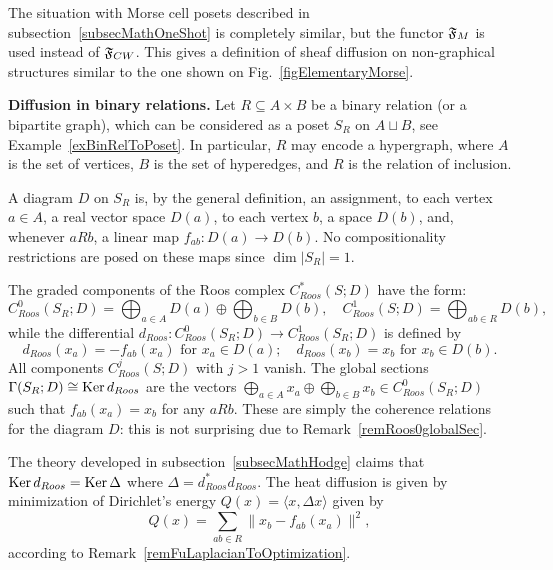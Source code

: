 \begin{rem}\label{remDiffusionOnMorse}
The situation with Morse cell posets described in subsection~\ref{subsecMathOneShot} is completely similar, but the functor $\mathfrak{F}_{M}$ is used instead of $\mathfrak{F}_{CW}$. This gives a definition of sheaf diffusion on non-graphical structures similar to the one shown on Fig.~\ref{figElementaryMorse}.
\end{rem}

\textbf{Diffusion in binary relations.} Let $R\subseteq A\times B$ be a binary relation (or a bipartite graph), which can be considered as a poset $S_R$ on $A\sqcup B$, see Example~\ref{exBinRelToPoset}. In particular, $R$ may encode a hypergraph, where $A$ is the set of vertices, $B$ is the set of hyperedges, and $R$ is the relation of inclusion. 

\begin{con}\label{conHypergraphDiffusion}
A diagram $D$ on $S_R$ is, by the general definition, an assignment, to each vertex $a\in A$, a real vector space $D(a)$, to each vertex $b$, a space $D(b)$, and, whenever $aRb$, a linear map $f_{ab}\colon D(a)\to D(b)$. No compositionality restrictions are posed on these maps since $\dim |S_R|=1$.

The graded components of the Roos complex $C^*_{Roos}(S;D)$ have the form:
\[
C^0_{Roos}(S_R;D)=\bigoplus_{a\in A}D(a)\oplus\bigoplus_{b\in B}D(b),\quad C^1_{Roos}(S;D)=\bigoplus_{ab\in R}D(b),
\]
while the differential $d_{Roos}\colon C^0_{Roos}(S_R;D)\to C^1_{Roos}(S_R;D)$ is defined by
\[
d_{Roos}(x_a)=-f_{ab}(x_a) \mbox{ for }x_a\in D(a);\quad d_{Roos}(x_b)=x_b \mbox{ for }x_b\in D(b).
\]
All components $C^j_{Roos}(S;D)$ with $j>1$ vanish. The global sections $\Gamma(S_R;D)\cong \operatorname{Ker} d_{Roos}$ are the vectors $\bigoplus_{a\in A}x_a\oplus \bigoplus_{b\in B}x_b\in C^0_{Roos}(S_R;D)$ such that $f_{ab}(x_a)=x_b$ for any $aRb$. These are simply the coherence relations for the diagram $D$: this is not surprising due to Remark~\ref{remRoos0globalSec}. 

The theory developed in subsection~\ref{subsecMathHodge} claims that $\operatorname{Ker} d_{Roos}=\operatorname{Ker} \Delta$ where $\Delta=d_{Roos}^*d_{Roos}$. The heat diffusion is given by minimization of Dirichlet's energy $Q(x)=\langle x,\Delta x\rangle$ given by
\begin{equation}\label{eqRelationDiriclet}
Q(x)=\sum_{ab\in R}\|x_b-f_{ab}(x_a)\|^2,
\end{equation}
according to Remark~\ref{remFuLaplacianToOptimization}. 
\end{con}

